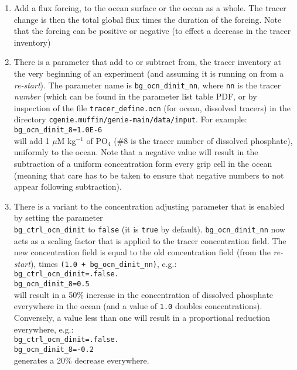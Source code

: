 \documentclass[11pt,fleqn]{book} %
\begin{document}
\begin{enumerate}[noitemsep]

\vspace{1mm}
\item Add a flux forcing, to the ocean surface or the ocean as a whole. The tracer change is then the total global flux times the duration of the forcing. Note that the forcing can be positive or negative (to effect a decrease in the tracer inventory)

\vspace{1mm}
\item There is a parameter that add to or subtract from, the tracer inventory at the very beginning of an experiment (and assuming it is running on from a \textit{re-start}). The parameter name is \texttt{bg\_ocn\_dinit\_nn}, where \texttt{nn} is the tracer \textit{number} (which can be found in the parameter list table PDF, or by inspection of the file \texttt{tracer\_define.ocn} (for ocean, dissolved tracers) in the directory \texttt{cgenie.muffin/genie-main/data/input}. For example:
\\\texttt{bg\_ocn\_dinit\_8=1.0E-6}
\\will add 1 \(\mu\)M kg\(^{-1}\) of PO\(_{4}\) (\#8 is the tracer number of dissolved phosphate), uniformly to the ocean.
Note that a negative value will result in the subtraction of a uniform concentration form every grip cell in the ocean (meaning that care has to be taken to ensure that negative numbers to not appear following subtraction).

\vspace{1mm}
\item There is a variant to the concentration adjusting parameter that is enabled by setting the parameter
\\ \texttt{bg\_ctrl\_ocn\_dinit} to \texttt{false} (it is \texttt{true} by default). \texttt{bg\_ocn\_dinit\_nn} now acts as a scaling factor that is applied to the tracer concentration field. The new concentration field is equal to the old concentration field (from the \textit{re-start}), times \texttt{(1.0 + bg\_ocn\_dinit\_nn)}, e.g.:
\\\texttt{bg\_ctrl\_ocn\_dinit=.false.}
\\\texttt{bg\_ocn\_dinit\_8=0.5}
\\will result in a 50\% increase in the concentration of dissolved phosphate   everywhere in the ocean (and a value of \texttt{1.0} doubles  concentrations). Conversely, a value less than one will result in a proportional reduction everywhere, e.g.:
\\\texttt{bg\_ctrl\_ocn\_dinit=.false.}
\\\texttt{bg\_ocn\_dinit\_8=-0.2}
\\generates a 20\% decrease everywhere.

\end{enumerate}
\end{document}
